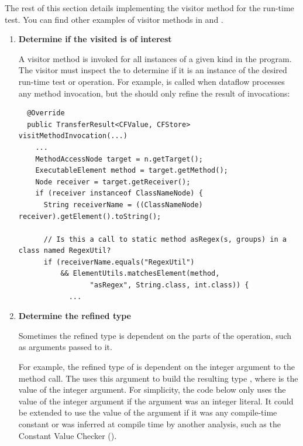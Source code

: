 \begin{sloppypar}
The rest of this section details implementing the visitor method
 for the 
run-time test.  You can find other examples of visitor methods in
 and
.
\end{sloppypar}



\begin{enumerate}
\item \textbf{Determine if the visited  is of
    interest}

A visitor method is invoked for all
instances of a given  kind in the
program.
The visitor must inspect the
 to determine if it is an
instance of the desired run-time test or operation.  For example,
 is called when dataflow processes any method
invocation, but the  should only refine
the result of  invocations:

\begin{smaller}
\begin{Verbatim}
  @Override
  public TransferResult<CFValue, CFStore> visitMethodInvocation(...)
    ...
    MethodAccessNode target = n.getTarget();
    ExecutableElement method = target.getMethod();
    Node receiver = target.getReceiver();
    if (receiver instanceof ClassNameNode) {
      String receiverName = ((ClassNameNode) receiver).getElement().toString();

      // Is this a call to static method asRegex(s, groups) in a class named RegexUtil?
      if (receiverName.equals("RegexUtil")
          && ElementUtils.matchesElement(method,
                 "asRegex", String.class, int.class)) {
            ...
\end{Verbatim}
\end{smaller}

\item \textbf{Determine the refined type}

Sometimes the refined type is dependent on the parts of the operation,
such as arguments passed to it.

For example, the refined type of  is dependent on the
integer argument to the method call. The 
uses this argument to build the resulting type , where 
is the value of the integer argument.  For simplicity, the code below only uses
the value of the integer argument if the argument was an integer literal.  It
could be extended to use the value of the argument if it was any compile-time
constant or was inferred at compile time by another analysis, such as the
Constant Value Checker ().


\end{enumerate}

